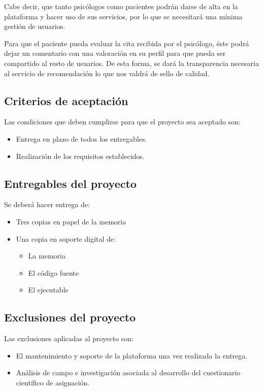 Cabe decir, que tanto psicólogos como pacientes podrán darse de alta en la plataforma y hacer uso de sus servicios, por lo que se necesitará una mínima gestión de usuarios. 


Para que el paciente pueda evaluar la cita recibida por el psicólogo, éste podrá dejar un comentario con una valoración en su perfil para que pueda ser compartido al resto de usuarios. De esta forma, se dará la transparencia necesaria al servicio de recomendación lo que nos valdrá de sello de calidad.

\subsection{Criterios de aceptación}
Las condiciones que deben cumplirse para que el proyecto sea aceptado son:

\begin{itemize}
\item Entrega en plazo de todos los entregables.
\item Realización de los requisitos establecidos.
\end{itemize}

\subsection{Entregables del proyecto}
Se deberá hacer entrega de:

\begin{itemize}
\item Tres copias en papel de la memoria
\item Una copia en soporte digital de:
	\begin{itemize}
		\item La memoria
		\item El código fuente
		\item El ejecutable
	\end{itemize}
\end{itemize}

\subsection{Exclusiones del proyecto}
Las exclusiones aplicadas al proyecto son:

\begin{itemize}
\item El mantenimiento y soporte de la plataforma una vez realizada la entrega.
\item Análisis de campo e investigación asociada al desarrollo del cuestionario científico de asignación.
\end{itemize}

